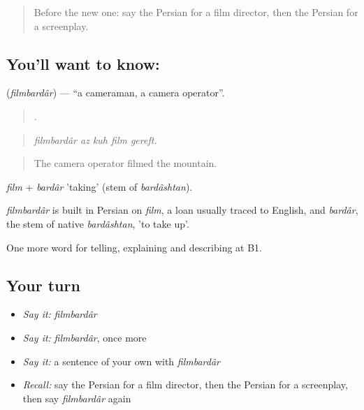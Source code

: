 \label{lesson:FA-C524-filmbardar}



\begin{quote}
Before the new one: say the Persian for a film director, then the Persian for a screenplay.
\end{quote}

\subsection*{You'll want to know: }
\textbf{} (\emph{filmbardâr}) — \textquotedblleft{}a cameraman, a camera operator\textquotedblright{}.

\begin{quote}
    .
\end{quote}

\begin{quote}
\emph{filmbardâr az kuh film gereft.}
\end{quote}

\begin{quote}
The camera operator filmed the mountain.
\end{quote}

\emph{film} + \emph{bardâr} 'taking' (stem of \emph{bardâshtan}).

\begin{cousinweb}
\emph{filmbardâr} is built in Persian on \emph{film}, a loan usually traced to English, and \emph{bardâr}, the stem of native \emph{bardâshtan}, 'to take up'.
\end{cousinweb}

\begin{grammarlens}[title={What you've built}]
One more word for telling, explaining and describing at B1.
\end{grammarlens}

\subsection*{Your turn}
\begin{itemize}
\raggedright
  \item \emph{Say it:} \emph{filmbardâr}
  \item \emph{Say it:} \emph{filmbardâr}, once more
  \item \emph{Say it:} a sentence of your own with \emph{filmbardâr}
  \item \emph{Recall:} say the Persian for a film director, then the Persian for a screenplay, then say \emph{filmbardâr} again
\end{itemize}

